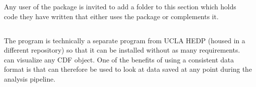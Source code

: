 Any user of the package is invited to add a folder to this section which holds code they have written that either uses the package or complements it.


\subsection{\label{dataview}}

The  program is technically a separate program from UCLA HEDP (housed in a different repository) so that it can be installed without as many requirements.  can visualize any CDF object. One of the benefits of using a consistent data format is that  can therefore be used to look at data saved at any point during the analysis pipeline.
